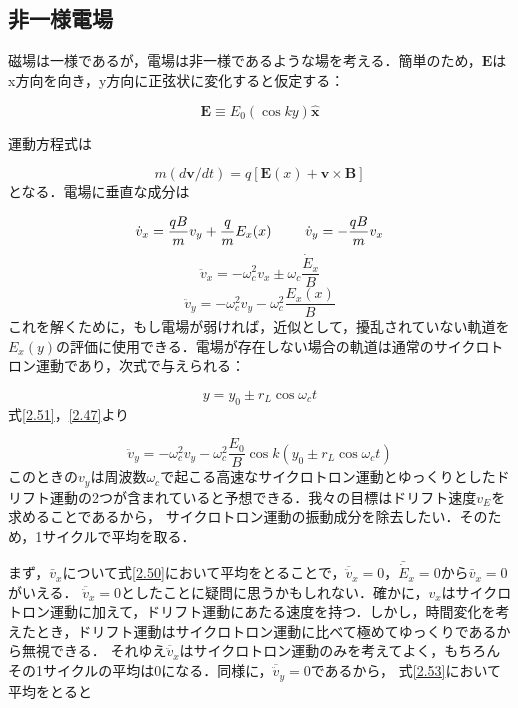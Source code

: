 \documentclass{ltjsarticle}
\numberwithin{equation}{section} %
\numberwithin{equation}{section}
\begin{document}
\subsection{非一様電場}
磁場は一様であるが，電場は非一様であるような場を考える．簡単のため，$\bm{E}$はx方向を向き，y方向に正弦状に変化すると仮定する：

\begin{equation}
  \bm{E} \equiv E_0(\cos ky)\hat{\bm{x}} \label{2.47}
\end{equation}

運動方程式は

 \begin{equation}
  m(d\bm{v}/dt) = q[\bm{E}(x) + \bm{v} \times \bm{B}] \label{2.48} 
 \end{equation}
となる．電場に垂直な成分は

\begin{equation}
  \dot{v}_x = \frac{qB}{m}v_y + \frac{q}{m}E_x(x) \hspace{2pc} \dot{v}_y = -\frac{qB}{m}v_x \label{2.49}
\end{equation}
\begin{equation}
  \ddot{v}_x = -\omega_c ^2 v_x \pm \omega_c \frac{\dot{E}_x}{B} \label{2.50}
\end{equation}
\begin{equation}
  \ddot{v}_y = -\omega_c ^2 v_y - \omega_c ^2 \frac{E_x(x)}{B} \label{2.51}
\end{equation}
これを解くために，もし電場が弱ければ，近似として，擾乱されていない軌道を$E_x(y)$の評価に使用できる．電場が存在しない場合の軌道は通常のサイクロトロン運動であり，次式で与えられる：

\begin{equation}
  y = y_0 \pm r_L \cos{\omega_c t} \label{2.52}
\end{equation}
式\eqref{2.51}，\eqref{2.47}より

\begin{equation}
  \ddot{v}_y = -\omega_c ^2 v_y - \omega_c ^2 \frac{E_0}{B} \cos k(y_0 \pm r_L \cos{\omega_c t}) \label{2.53}
\end{equation}
このときの$v_y$は周波数$\omega_c$で起こる高速なサイクロトロン運動とゆっくりとしたドリフト運動の2つが含まれていると予想できる．我々の目標はドリフト速度$v_E$を求めることであるから，
サイクロトロン運動の振動成分を除去したい．そのため，1サイクルで平均を取る．

まず，$\bar{v}_x$について式\eqref{2.50}において平均をとることで，$\overline{\ddot{v}}_x = 0$，$\bar{\dot{E}}_x = 0$から$\bar{v}_x = 0$がいえる．
$\overline{\ddot{v}}_x = 0$としたことに疑問に思うかもしれない．確かに，$v_x$はサイクロトロン運動に加えて，ドリフト運動にあたる速度を持つ．しかし，時間変化を考えたとき，ドリフト運動はサイクロトロン運動に比べて極めてゆっくりであるから無視できる．
それゆえ$\overline{\ddot{v}}_x$はサイクロトロン運動のみを考えてよく，もちろんその1サイクルの平均は0になる．同様に，$\overline{\ddot{v}}_y = 0$であるから，
式\eqref{2.53}において平均をとると
\end{document}
